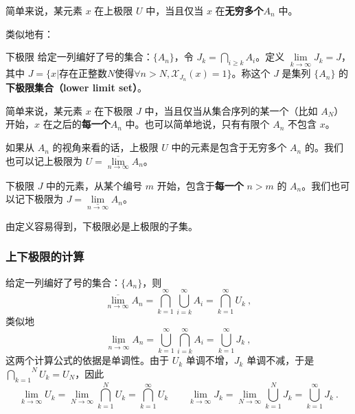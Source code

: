 简单来说，某元素 $x$ 在上极限 $U$ 中，当且仅当 $x$ 在\textbf{无穷多个}$A_n$ 中。

类似地有：

\begin{definition}{下极限}
给定一列编好了号的集合：$\{A_n\}$，令 $J_k=\underset{i\ge k}{\bigcap} A_i$。定义 $\lim\limits_{k\to\infty} J_k=J$，其中 $J=\{x|\text{存在正整数}N\text{使得}\forall n>N, \mathcal{X}_{J_n}(x)=1\}$。称这个 $J$ 是集列 $\{A_n\}$ 的\textbf{下极限集合（lower limit set）}。
\end{definition}

简单来说，某元素 $x$ 在下极限 $J$ 中，当且仅当从集合序列的某一个（比如 $A_N$）开始，$x$ 在之后的\textbf{每一个}$A_n$ 中。也可以简单地说，只有有限个 $A_n$ 不包含 $x$。

如果从 $A_n$ 的视角来看的话，上极限 $U$ 中的元素是包含于无穷多个 $A_n$ 的。我们也可以记上极限为 $U=\underset{n\to \infty}{\overline{\lim}} A_n$。

下极限 $J$ 中的元素，从某个编号 $m$ 开始，包含于\textbf{每一个} $n>m$ 的 $A_n$。我们也可以记下极限为 $J=\underset{n\to \infty}{\underline{\lim}}A_n$。

由定义容易得到，下极限必是上极限的子集。

\subsubsection{上下极限的计算}
给定一列编好了号的集合：$\{A_n\}$，则
\begin{equation}
\underset{n\to \infty}{\overline{\lim}} A_n = \overset {\infty}{\underset{k=1}{\bigcap}} \overset{\infty}{\underset{i=k}{\bigcup}} A_i = \overset{\infty}{\underset{k=1}{\bigcap}} U_k~,
\end{equation}
类似地
\begin{equation}
\underset{n\to \infty}{\underline{\lim}}A_n=\overset{\infty}{\underset{k=1}{\bigcup}}\overset{\infty}{\underset{i=k}{\bigcap}} A_i=\overset{\infty} {\underset{k=1}{\bigcup}} J_k~,
\end{equation}
这两个计算公式的依据是单调性。由于 $U_k$ 单调不增，$J_k$ 单调不减，于是 $\displaystyle \overset{N}{\underset{k=1}{\bigcap}}U_k=U_N$，因此
\begin{equation}
\lim_{k\to\infty}U_k=\lim\limits_{N\to\infty}\overset{N}{\underset{k=1}{\bigcap}} U_k=\overset{\infty}{\underset{k=1}{\bigcap}}U_k
\qquad
\lim\limits_{k\to\infty}J_k=\lim\limits_{N\to\infty}\overset{N}{\underset{k=1}{\bigcup}} J_k=\overset{\infty}{\underset{k=1}{\bigcup}} J_k~.
\end{equation}

